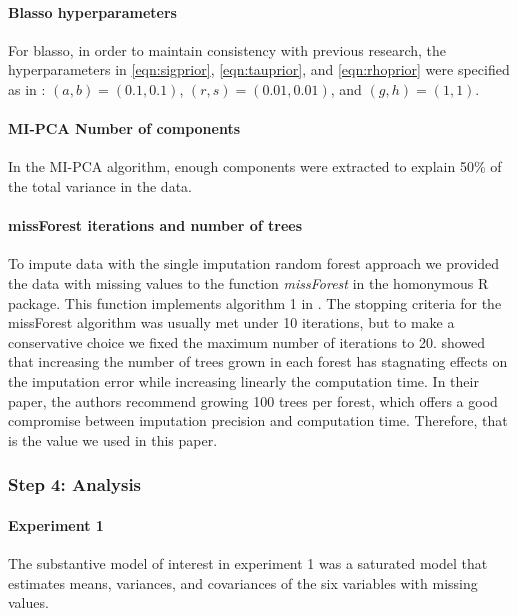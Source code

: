 	\paragraph{Blasso hyperparameters}

	For blasso, in order to maintain consistency with previous research, the hyperparameters in \ref{eqn:sigprior},
	\ref{eqn:tauprior}, and \ref{eqn:rhoprior} were specified as in \cite{zhaoLong:2016}: $(a,b)=(0.1, 0.1)$, 
	$(r,s)=(0.01, 0.01)$, and $(g,h)=(1,1)$.

	\paragraph{MI-PCA Number of components}

	In the MI-PCA algorithm, enough components were extracted to explain 50\% of the total variance in the data.

	\paragraph{missForest iterations and number of trees}

	To impute data with the single imputation random forest approach we provided the data
	with missing values to the function \emph{missForest} in the homonymous R package.
	This function implements algorithm 1 in \cite{stekhovenBuhlmann:2011}.
	The stopping criteria for the missForest algorithm was usually met under 10 iterations, but to make a
	conservative choice we fixed the maximum number of iterations to 20.
	\cite{stekhovenBuhlmann:2011} showed that increasing the number of trees grown in each forest has 
	stagnating effects on the imputation error while increasing linearly the computation time.
	In their paper, the authors recommend growing 100 trees per forest, which offers a good compromise 
	between imputation precision and computation time.
	Therefore, that is the value we used in this paper.

\subsubsection{Step 4: Analysis}
	
	\paragraph{Experiment 1}
	The substantive model of interest in experiment 1 was a saturated model that estimates means,
	variances, and covariances of the six variables with missing values.

